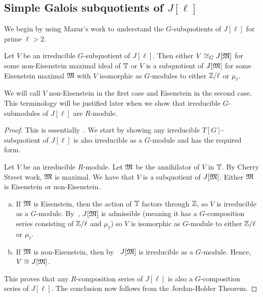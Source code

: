 \documentclass{article}
\begin{document}
\subsection{Simple Galois subquotients of $J[\ell]$}

We begin by using Mazur's work to understand the $G$-subquotients of $J[\ell]$
for prime $\ell>2$.

\begin{theorem}\label{theorem:irreducible_G_sub}
    Let $V$ be an irreducible $G$-subquotient of $J[\ell]$. Then either $V\cong_G
    J[\mathfrak{M}]$ for some non-Eisenstein maximal ideal of $\mathbb{T}$ or $V$ is a
    subquotient of $J[\mathfrak{M}]$ for some Eisenstein maximal $\mathfrak{M}$ with $V$
    isomorphic as $G$-modules to either $\mathbb{Z}/\ell$ or $\mu_\ell$.

    We will call $V$ non-Eisenstein in the first case and Eisenstein in the
    second case. This terminology will be justified later when we show that
    irreducible $G$-submodules of $J[\ell]$ are $R$-module.
\end{theorem}
\begin{proof}
    This is essentially~\cite[\S 14]{mazur:eisenstein}. We start by showing any
    irreducible $T[G]$-subquotient of $J[\ell]$ is also irreducible as a
    $G$-module and has the required form.

    Let $V$ be an irreducible $R$-module. Let $\mathfrak{M}$ be the annihilator of $V$
    in $\mathbb{T}$. By Cherry Street work, $\mathfrak{M}$ is maximal. We have that $V$ is a
    subquotient of $J[\mathfrak{M}]$. Either $\mathfrak{M}$ is Eisenstein or non-Eisenstein.
    \begin{enumerate}[(a)]
        \item
            If $\mathfrak{M}$ is Eisenstein, then the action of $\mathbb{T}$ factors through
            $\mathbb{Z}$, so $V$ is irreducible as a $G$-module. By~\cite[Proposition
            14.1]{mazur:eisenstein}, $J[\mathfrak{M}]$ is admissible (meaning it has a
            $G$-composition series consisting of $\mathbb{Z}/\ell$ and $\mu_\ell$) so
            $V$ is isomorphic as $G$-module to either $\mathbb{Z}/\ell$ or $\mu_\ell$.
        \item
            If $\mathfrak{M}$ is non-Eisenstein, then by~\cite[Proposition
            14.2]{mazur:eisenstein} $J[\mathfrak{M}]$ is irreducible as a $G$-module.
            Hence, $V\cong J[\mathfrak{M}]$.
    \end{enumerate}
    This proves that any $R$-composition series of $J[\ell]$ is also a
    $G$-composition series of $J[\ell]$. The conclusion now follows from the
    Jordan-Holder Theorem.
\end{proof} 
\end{document}
